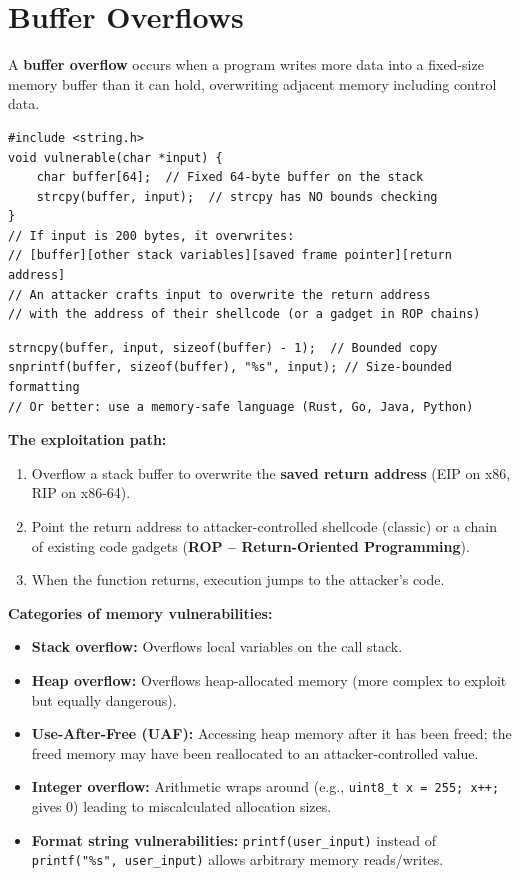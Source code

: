\documentclass[11pt, letterpaper]{article}
\begin{document}
\vspace{8pt}

\section*{Buffer Overflows}

A \textbf{buffer overflow} occurs when a program writes more data into a fixed-size memory buffer than it can hold, overwriting adjacent memory including control data.

\begin{lstlisting}[style=vuln, caption={Classic stack buffer overflow in C}]
#include <string.h>
void vulnerable(char *input) {
    char buffer[64];  // Fixed 64-byte buffer on the stack
    strcpy(buffer, input);  // strcpy has NO bounds checking
}
// If input is 200 bytes, it overwrites:
// [buffer][other stack variables][saved frame pointer][return address]
// An attacker crafts input to overwrite the return address
// with the address of their shellcode (or a gadget in ROP chains)
\end{lstlisting}

\begin{lstlisting}[style=safe, caption={Safe alternatives in C -- always use size-bounded functions}]
strncpy(buffer, input, sizeof(buffer) - 1);  // Bounded copy
snprintf(buffer, sizeof(buffer), "%s", input); // Size-bounded formatting
// Or better: use a memory-safe language (Rust, Go, Java, Python)
\end{lstlisting}

\textbf{The exploitation path:}
\begin{enumerate}[noitemsep]
  \item Overflow a stack buffer to overwrite the \textbf{saved return address} (EIP on x86, RIP on x86-64).
  \item Point the return address to attacker-controlled shellcode (classic) or a chain of existing code gadgets (\textbf{ROP -- Return-Oriented Programming}).
  \item When the function returns, execution jumps to the attacker's code.
\end{enumerate}

\textbf{Categories of memory vulnerabilities:}
\begin{itemize}[noitemsep]
  \item \textbf{Stack overflow:} Overflows local variables on the call stack.
  \item \textbf{Heap overflow:} Overflows heap-allocated memory (more complex to exploit but equally dangerous).
  \item \textbf{Use-After-Free (UAF):} Accessing heap memory after it has been freed; the freed memory may have been reallocated to an attacker-controlled value.
  \item \textbf{Integer overflow:} Arithmetic wraps around (e.g., \texttt{uint8\_t x = 255; x++;} gives 0) leading to miscalculated allocation sizes.
  \item \textbf{Format string vulnerabilities:} \texttt{printf(user\_input)} instead of \texttt{printf("\%s", user\_input)} allows arbitrary memory reads/writes.
\end{itemize}
\end{document}
